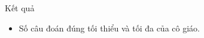Kết quả
\begin{itemize}
	\item        Số câu đoán    đúng tối thiểu và tối đa của cô giáo.      
\end{itemize}